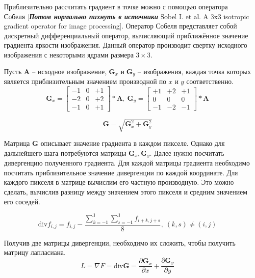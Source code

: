 Приблизительно рассчитать градиент в точке можно с помощью оператора Собеля [\textbf{\textit{Потом нормально пихнуть в источники}} Sobel I. et al. A 3x3 isotropic gradient operator for image processing]. Оператор Собеля представляет собой дискретный дифференциальный оператор, вычисляющий приближённое значение градиента яркости изображения. Данный оператор производит свертку исходного изображения с некоторыми ядрами размера $3 \times 3$.

Пусть \textbf{A} -- исходное изображение, $\textbf{G}_x$ и $\textbf{G}_y$ -- изображения, каждая точка которых является приблизительным значением производной по $x$ и $y$ соответственно.
\begin{equation}
	\textbf{G}_x =
	\begin{bmatrix}
		-1 & 0 & +1\\
		-2 & 0 & +2\\
		-1 & 0 & +1
	\end{bmatrix}
	* \textbf{A},\ 
	\textbf{G}_y =
	\begin{bmatrix}
		+1 & +2 & +1\\
		0 & 0 & 0\\
		-1 & -2 & -1
	\end{bmatrix}
	* \textbf{A}
\end{equation}

\begin{equation}
	\textbf{G} = \sqrt{\textbf{G}_x^2 + \textbf{G}_y^2}
\end{equation}

Матрица \textbf{G} описывает значение градиента в каждом пикселе. Однако для дальнейшего шага потребуются матрицы $\textbf{G}_x, \textbf{G}_y$. Далее нужно посчитать дивергенцию полученного градиента. Для каждой матрицы градиента необходимо посчитать приблизительное значение дивергенции по каждой координате. Для каждого пикселя в матрице вычислим его частную производную. Это можно сделать, вычислив разницу между значением этого пикселя и средним значением его соседей.

\begin{equation}
	\text{div} f_{i,j} = f_{i,j} - \dfrac{\sum\limits_{k=-1}^{1}\sum\limits_{s=-1}^{1}f_{i+k,j+s}}{8},\ (k,s) \neq (i,j)
\end{equation}

Получив две матрицы дивергенции, необходимо их сложить, чтобы получить матрицу лапласиана. 
\begin{equation}
	L = \nabla F = \text{div} \textbf{G} = \frac{\partial \textbf{G}_x}{\partial x} + \frac{\partial \textbf{G}_y}{\partial y}
\end{equation}

